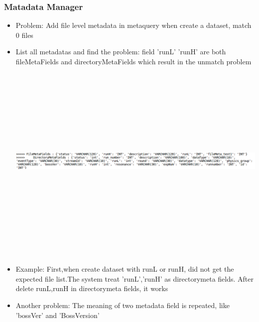 \documentclass{beamer}
\begin{document}
\begin{frame}
  \frametitle{Matadata Manager}
  \begin{itemize}
    \item Problem: Add file level metadata in metaquery when create a dataset, match 0 files
    \item List all metadatas and find the problem: field 'runL' 'runH' are both fileMetaFields and directoryMetaFields which
      result in the unmatch problem
  \hspace{0.5cm} 
  \includegraphics[height=10cm,width=15cm,keepaspectratio]{data/metaShow.png}
  \item Example: First,when create dataset with runL or runH, did not get the expected file list.The system treat 'runL','runH' as directorymeta fields. After delete runL,runH in directorymeta fields, it works
  \item Another problem: The meaning of two metadata field is repeated, like 'bossVer' and 'BossVersion'
  \end{itemize}
\end{frame}
\end{document}
